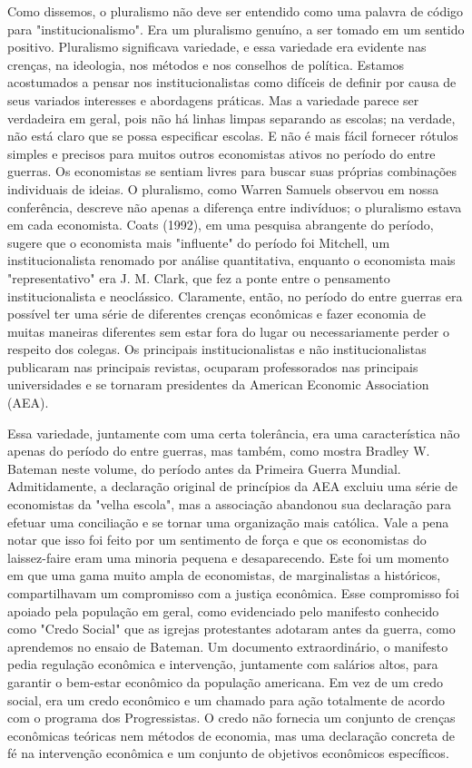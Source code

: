 \documentclass[12pt]{article}
\begin{document}
Como dissemos, o pluralismo não deve ser entendido como uma palavra de código para "institucionalismo". Era um pluralismo genuíno, a ser tomado em um sentido positivo. Pluralismo significava variedade, e essa variedade era evidente nas crenças, na ideologia, nos métodos e nos conselhos de política. Estamos acostumados a pensar nos institucionalistas como difíceis de definir por causa de seus variados interesses e abordagens práticas. Mas a variedade parece ser verdadeira em geral, pois não há linhas limpas separando as escolas; na verdade, não está claro que se possa especificar escolas. E não é mais fácil fornecer rótulos simples e precisos para muitos outros economistas ativos no período do entre guerras. Os economistas se sentiam livres para buscar suas próprias combinações individuais de ideias. O pluralismo, como Warren Samuels observou em nossa conferência, descreve não apenas a diferença entre indivíduos; o pluralismo estava em cada economista. Coats (1992), em uma pesquisa abrangente do período, sugere que o economista mais "influente" do período foi Mitchell, um institucionalista renomado por análise quantitativa, enquanto o economista mais "representativo" era J. M. Clark, que fez a ponte entre o pensamento institucionalista e neoclássico. Claramente, então, no período do entre guerras era possível ter uma série de diferentes crenças econômicas e fazer economia de muitas maneiras diferentes sem estar fora do lugar ou necessariamente perder o respeito dos colegas. Os principais institucionalistas e não institucionalistas publicaram nas principais revistas, ocuparam professorados nas principais universidades e se tornaram presidentes da American Economic Association (AEA).

Essa variedade, juntamente com uma certa tolerância, era uma característica não apenas do período do entre guerras, mas também, como mostra Bradley W. Bateman neste volume, do período antes da Primeira Guerra Mundial. Admitidamente, a declaração original de princípios da AEA excluiu uma série de economistas da "velha escola", mas a associação abandonou sua declaração para efetuar uma conciliação e se tornar uma organização mais católica. Vale a pena notar que isso foi feito por um sentimento de força e que os economistas do laissez-faire eram uma minoria pequena e desaparecendo. Este foi um momento em que uma gama muito ampla de economistas, de marginalistas a históricos, compartilhavam um compromisso com a justiça econômica. Esse compromisso foi apoiado pela população em geral, como evidenciado pelo manifesto conhecido como "Credo Social" que as igrejas protestantes adotaram antes da guerra, como aprendemos no ensaio de Bateman. Um documento extraordinário, o manifesto pedia regulação econômica e intervenção, juntamente com salários altos, para garantir o bem-estar econômico da população americana. Em vez de um credo social, era um credo econômico e um chamado para ação totalmente de acordo com o programa dos Progressistas. O credo não fornecia um conjunto de crenças econômicas teóricas nem métodos de economia, mas uma declaração concreta de fé na intervenção econômica e um conjunto de objetivos econômicos específicos.
\end{document}
